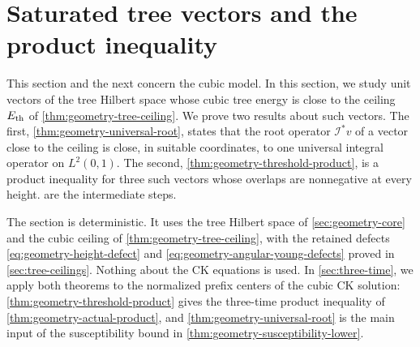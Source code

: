 \chapter{Saturated tree vectors and the product inequality}\label{sec:geometry-results}

This section and the next concern the cubic model. In this section, we study unit vectors of the tree Hilbert space whose cubic tree energy is close to the ceiling $E_{\mathrm{th}}$ of \cref{thm:geometry-tree-ceiling}. We prove two results about such vectors. The first, \cref{thm:geometry-universal-root}, states that the root operator $\mathcal I^*v$ of a vector close to the ceiling is close, in suitable coordinates, to one universal integral operator on $L^2(0,1)$. The second, \cref{thm:geometry-threshold-product}, is a product inequality for three such vectors whose overlaps are nonnegative at every height.  are the intermediate steps.

The section is deterministic. It uses the tree Hilbert space of \cref{sec:geometry-core} and the cubic ceiling of \cref{thm:geometry-tree-ceiling}, with the retained defects \eqref{eq:geometry-height-defect} and \eqref{eq:geometry-angular-young-defects} proved in \cref{sec:tree-ceilings}. Nothing about the CK equations is used. In \cref{sec:three-time}, we apply both theorems to the normalized prefix centers of the cubic CK solution: \cref{thm:geometry-threshold-product} gives the three-time product inequality of \cref{thm:geometry-actual-product}, and \cref{thm:geometry-universal-root} is the main input of the susceptibility bound in \cref{thm:geometry-susceptibility-lower}.

